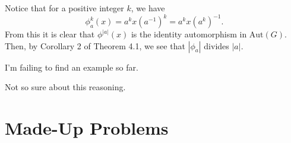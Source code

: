 \documentclass[12pt]{article}
\newcommand{\aut}{\mbox{Aut}}
\begin{document}
Notice that for a positive integer $k$, we have
\begin{equation*}
\phi_a^k(x) = a^kx(a^{-1})^k=a^kx(a^k)^{-1}.
\end{equation*}
From this it is clear that $\phi^{|a|}(x)$ is the identity automorphism in $\aut(G)$.
Then, by Corollary 2 of Theorem 4.1, we see that $|\phi_a|$ divides $|a|$.

I'm failing to find an example so far.

%
%
%

%
%

Not so sure about this reasoning.

\section*{Made-Up Problems}
\end{document}
